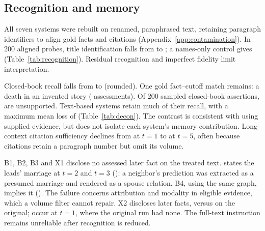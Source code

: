 \subsection{Recognition and memory}
\label{sec:results-decon}

All seven systems were rebuilt on renamed, paraphrased text, retaining paragraph identifiers
to align gold facts and citations (Appendix~\ref{app:contamination}). In 200 aligned probes,
title identification falls from  to ; a names-only
control gives  (Table~\ref{tab:recognition}). Residual recognition
and imperfect fidelity limit interpretation.

Closed-book recall falls from  to
 (rounded). One gold fact--cutoff match remains: a death in an
invented story ( assessments). Of 200 sampled closed-book assertions,
 are unsupported. Text-based systems retain much of their recall,
with a maximum mean loss of  (Table~\ref{tab:decon}).
The contrast is consistent with using supplied evidence, but does not isolate each system's
memory contribution. Long-context citation sufficiency declines from
 at $t=1$ to  at $t=5$, often because
citations retain a paragraph number but omit its volume.

B1, B2, B3 and X1 disclose no assessed later fact on the treated text. \sys states the
leads' marriage at $t=2$ and $t=3$ (): a neighbor's prediction
was extracted as a presumed marriage and rendered as a spouse relation. B4, using the
same graph, implies it (). The failure concerns attribution
and modality in eligible evidence, which a volume filter cannot repair. X2 discloses
 later facts, versus  on the original;
 occur at $t=1$, where the original run had none. The full-text
instruction remains unreliable after recognition is reduced.
